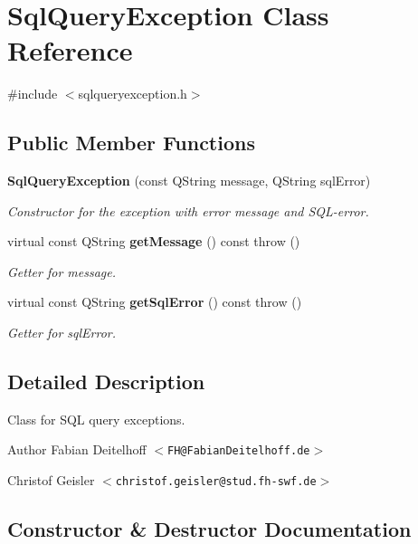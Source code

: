 \section{\-Sql\-Query\-Exception \-Class \-Reference}
\label{d2/d2a/classSqlQueryException}


{\ttfamily \#include $<$sqlqueryexception.\-h$>$}

\subsection*{\-Public \-Member \-Functions}
\begin{DoxyCompactItemize}
\item 
{\bf \-Sql\-Query\-Exception} (const \-Q\-String message, \-Q\-String sql\-Error)
\begin{DoxyCompactList}\small\item\em \-Constructor for the exception with error message and \-S\-Q\-L-\/error. \end{DoxyCompactList}\item 
virtual const \-Q\-String {\bf get\-Message} () const   throw ()
\begin{DoxyCompactList}\small\item\em \-Getter for message. \end{DoxyCompactList}\item 
virtual const \-Q\-String {\bf get\-Sql\-Error} () const   throw ()
\begin{DoxyCompactList}\small\item\em \-Getter for sql\-Error. \end{DoxyCompactList}\end{DoxyCompactItemize}


\subsection{\-Detailed \-Description}
\-Class for \-S\-Q\-L query exceptions.

\begin{DoxyAuthor}{\-Author}
\-Fabian \-Deitelhoff $<${\tt \-F\-H@\-Fabian\-Deitelhoff.\-de}$>$ 

\-Christof \-Geisler $<${\tt christof.\-geisler@stud.\-fh-\/swf.\-de}$>$ 
\end{DoxyAuthor}


\subsection{\-Constructor \& \-Destructor \-Documentation}
